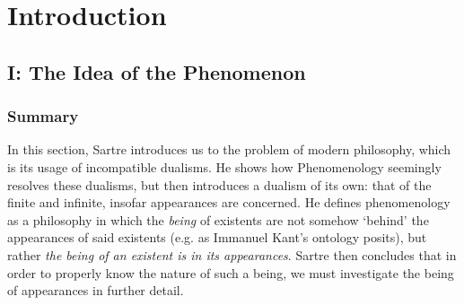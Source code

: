 \section{Introduction}

\subsection{I: The Idea of the Phenomenon}

\subsubsection*{Summary}
In this section, Sartre introduces us to the problem of modern philosophy, which is its usage of incompatible dualisms. He shows how Phenomenology seemingly resolves these dualisms, but then introduces a dualism of its own: that of the finite and infinite, insofar appearances are concerned. He defines phenomenology as a philosophy in which the \emph{being} of existents are not somehow `behind' the appearances of said existents (e.g. as Immanuel Kant's ontology posits), but rather \emph{the being of an existent is in its appearances}. Sartre then concludes that in order to properly know the nature of such a being, we must investigate the being of appearances in further detail.

